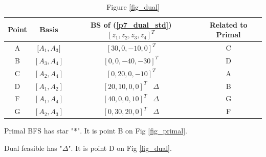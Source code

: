\documentclass[12pt]{article}
\begin{document}
\begin{table}[htbp]
\centering
\caption{Figure \ref{fig_dual}}
\label{BStable_dual}
\begin{tabular}{||c|c|c|c||}
\hline
 Point & Basis        & BS of (\ref{p7_dual_std}) $[z_1, z_2, z_3, z_4]^T$  & Related to Primal   \\
 \hline
A & ${[}A_1, A_3{]}$ & $[30, 0, -10, 0]^T$     &  C \\
 \hline
B  &  $[A_3, A_4]$   & $ [0, 0, -40, -30]^T $  &  D \\
 \hline
C  &  $[A_2, A_4]$   & $ [0, 20, 0, -10]^T $   &   A \\
 \hline
D  &  $[A_1, A_2]$   & $ [20, 10, 0, 0]^T $  \ $\Delta$  & B  \\
\hline 
F  &  $[A_1, A_4]$   & $ [40, 0, 0, 10]^T $  \ $\Delta$  &  G \\
\hline
G  &  $[A_2, A_3]$   & $ [0, 30, 20, 0]^T $  \ $\Delta$  & F \\
\hline
\end{tabular}
\end{table}
\FloatBarrier


Primal BFS has star "*". It is point B on Fig \ref{fig_primal}.

Dual feasible has "$\Delta$". It is point D on Fig \ref{fig_dual}.
\end{document}
